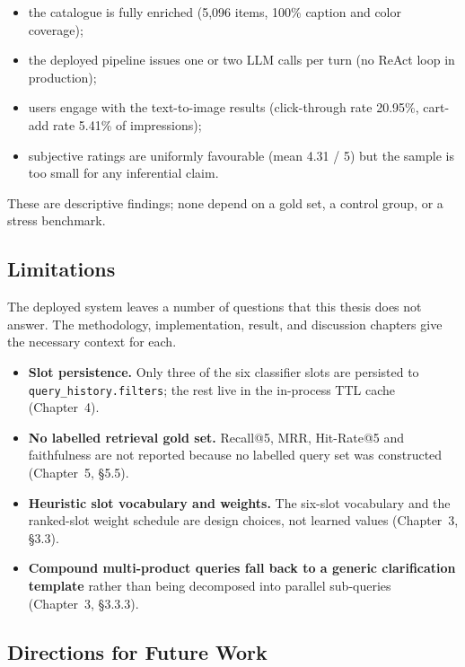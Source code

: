 \begin{itemize}
    \item the catalogue is fully enriched (5{,}096 items, 100\% caption and color coverage);
    \item the deployed pipeline issues one or two LLM calls per turn (no ReAct loop in production);
    \item users engage with the text-to-image results (click-through rate 20.95\%, cart-add rate 5.41\% of impressions);
    \item subjective ratings are uniformly favourable (mean 4.31 / 5) but the sample is too small for any inferential claim.
\end{itemize}

These are descriptive findings; none depend on a gold set, a control group, or a stress benchmark.

\subsection{Limitations}
\label{subsec:limitations}

The deployed system leaves a number of questions that this thesis does not answer. The methodology, implementation, result, and discussion chapters give the necessary context for each.

\begin{itemize}
    \item \textbf{Slot persistence.} Only three of the six classifier slots are persisted to \texttt{query\_history.filters}; the rest live in the in-process TTL cache (Chapter~4).
    \item \textbf{No labelled retrieval gold set.} Recall@5, MRR, Hit-Rate@5 and faithfulness are not reported because no labelled query set was constructed (Chapter~5, §5.5).
    \item \textbf{Heuristic slot vocabulary and weights.} The six-slot vocabulary and the ranked-slot weight schedule are design choices, not learned values (Chapter~3, §3.3).
    \item \textbf{Compound multi-product queries fall back to a generic clarification template} rather than being decomposed into parallel sub-queries (Chapter~3, §3.3.3).
\end{itemize}

\subsection{Directions for Future Work}
\label{subsec:future_work}

